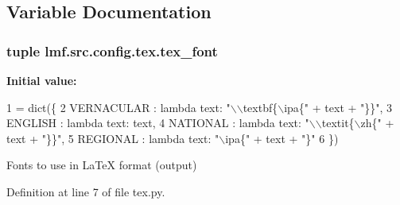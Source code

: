 \subsection{Variable Documentation}
\hypertarget{namespacelmf_1_1src_1_1config_1_1tex_a043963d19472fa939f381b521e696cf6}{
\subsubsection[{tex\+\_\+font}]{\setlength{\rightskip}{0pt plus 5cm}tuple lmf.\+src.\+config.\+tex.\+tex\+\_\+font}}\label{namespacelmf_1_1src_1_1config_1_1tex_a043963d19472fa939f381b521e696cf6}
{\bfseries Initial value\+:}
\begin{DoxyCode}
1 = dict(\{
2     VERNACULAR  : \textcolor{keyword}{lambda} text: \textcolor{stringliteral}{"\(\backslash\)\(\backslash\)textbf\{\(\backslash\)ipa\{"} + text + \textcolor{stringliteral}{"\}\}"},
3     ENGLISH     : \textcolor{keyword}{lambda} text: text,
4     NATIONAL    : \textcolor{keyword}{lambda} text: \textcolor{stringliteral}{"\(\backslash\)\(\backslash\)textit\{\(\backslash\)zh\{"} + text + \textcolor{stringliteral}{"\}\}"},
5     REGIONAL    : \textcolor{keyword}{lambda} text: \textcolor{stringliteral}{"\(\backslash\)ipa\{"} + text + \textcolor{stringliteral}{"\}"}
6 \})
\end{DoxyCode}


Fonts to use in La\+Te\+X format (output) 



Definition at line 7 of file tex.\+py.

